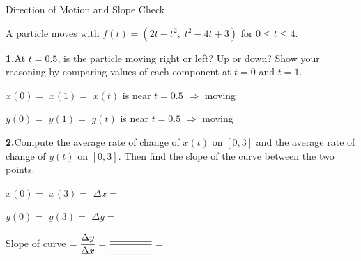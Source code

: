 \documentclass[10pt]{article}
\begin{document}
\namedateperiod

\vspace{0.12in}

\begin{notesbox}{Direction of Motion and Slope Check}

A particle moves with $f(t) = (2t - t^2,\; t^2 - 4t + 3)$ for $0 \le t \le 4$.

\vspace{10pt}
\textbf{1.}\quad At $t = 0.5$, is the particle moving right or left?
Up or down? Show your reasoning by comparing values of each
component at $t = 0$ and $t = 1$.

\vspace{6pt}
$x(0) = $ \blank{2cm} \qquad $x(1) = $ \blank{2cm} \qquad
$x(t)$ is \blank{2.5cm} near $t = 0.5$ $\Rightarrow$ moving \blank{2cm}

\vspace{8pt}
$y(0) = $ \blank{2cm} \qquad $y(1) = $ \blank{2cm} \qquad
$y(t)$ is \blank{2.5cm} near $t = 0.5$ $\Rightarrow$ moving \blank{2cm}

\vspace{12pt}
\textbf{2.}\quad Compute the average rate of change of $x(t)$ on $[0, 3]$
and the average rate of change of $y(t)$ on $[0, 3]$.
Then find the slope of the curve between the two points.

\vspace{6pt}
$x(0) = $ \blank{2cm} \qquad $x(3) = $ \blank{2cm} \qquad
$\Delta x = $ \blank{2cm}

\vspace{6pt}
$y(0) = $ \blank{2cm} \qquad $y(3) = $ \blank{2cm} \qquad
$\Delta y = $ \blank{2cm}

\vspace{8pt}
Slope of curve $= \dfrac{\Delta y}{\Delta x} = \dfrac{\blank{1.5cm}}{\blank{1.5cm}} = $ \blank{2cm}

\end{notesbox}
\end{document}
